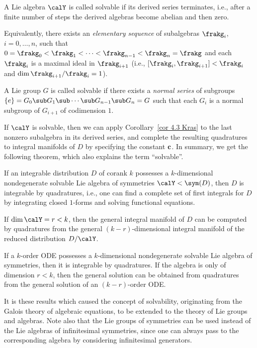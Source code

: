 \begin{defn}
    A Lie algebra $\calY$ is called solvable if its derived series terminates, i.e., after a finite number of steps the derived algebras become abelian and then zero. 
    
    Equivalently, there exists an \emph{elementary sequence} of subalgebras $\frakg_i$, $i=0,\ldots,n$, such that $0=\frakg_0<\frakg_1<\cdots<\frakg_{n-1}<\frakg_n=\frakg$ and each $\frakg_i$ is a maximal ideal in $\frakg_{i+1}$ (i.e., $[\frakg_i,\frakg_{i+1}]<\frakg_i$ and $\dim\frakg_{i+1}/\frakg_i=1$). 

    A Lie group $G$ is called solvable if there exists a \emph{normal series} of subgroups $\{e\}=G_0\sub G_1\sub \cdots\sub G_{n-1}\sub G_n=G$ such that each $G_i$ is a normal subgroup of $G_{i+1}$ of codimension $1$.
\end{defn}

If $\calY$ is solvable, then we can apply Corollary~\ref{cor 4.3 Kras} to the last nonzero subalgebra in its derived series, and complete the resulting quadratures to integral manifolds of $D$ by specifying the constant $\bf{c}$. In summary, we get the following theorem, which also explains the term ``solvable''.

\begin{thm}\label{thm 4.4 Kras}
    If an integrable distribution $D$ of corank $k$ possesses a $k$-dimensional nondegenerate solvable Lie algebra of symmetries $\calY<\sym(D)$, then $D$ is integrable by quadratures, i.e., one can find a complete set of first integrals for $D$ by integrating closed $1$-forms and solving functional equations.

    If $\dim \calY=r<k$, then the general integral manifold of $D$ can be computed by quadratures from the general $(k-r)$-dimensional integral manifold of the reduced distribution $D\slash \calY$.
\end{thm}

\begin{thm}\label{thm Bianchi-Lie}
    If a $k$-order ODE possesses a $k$-dimensional nondegenerate solvable Lie algebra of symmetries, then it is integrable by quadratures. If the algebra is only of dimension $r<k$, then the general solution can be obtained from quadratures from the general solution of an $(k-r)$-order ODE.
\end{thm}

It is these results which caused the concept of solvability, originating from the Galois theory of algebraic equations, to be extended to the theory of Lie groups and algebras. Note also that the Lie groups of symmetries can be used instead of the Lie algebras of infinitesimal symmetries, since one can always pass to the corresponding algebra by considering infinitesimal generators.

